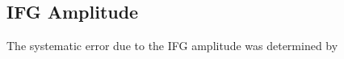 










\subsection{IFG Amplitude}


The systematic error due to the IFG amplitude was determined by 




